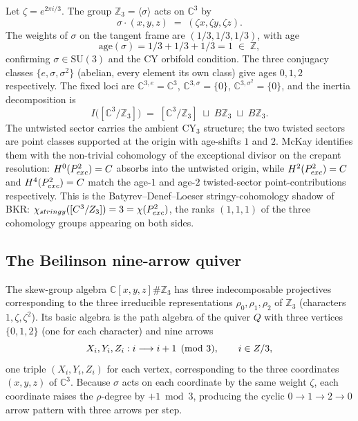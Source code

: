 Let $\zeta = e^{2\pi i/3}$. The group $\mathbb{Z}_3 = \langle \sigma \rangle$ acts on $\mathbb{C}^3$ by
\[
\sigma \cdot (x, y, z) \;=\; (\zeta x, \zeta y, \zeta z).
\]
The weights of $\sigma$ on the tangent frame are $(1/3, 1/3, 1/3)$, with age
\[
\mathrm{age}(\sigma) = 1/3 + 1/3 + 1/3 = 1 \;\in\; \mathbb{Z},
\]
confirming $\sigma \in \mathrm{SU}(3)$ and the CY orbifold condition. The three conjugacy classes $\{e, \sigma, \sigma^2\}$ (abelian, every element its own class) give ages $0, 1, 2$ respectively. The fixed loci are $\mathbb{C}^{3,e} = \mathbb{C}^3$, $\mathbb{C}^{3,\sigma} = \{0\}$, $\mathbb{C}^{3,\sigma^2} = \{0\}$, and the inertia decomposition is
\[
I\bigl([\mathbb{C}^3/\mathbb{Z}_3]\bigr) \;=\; [\mathbb{C}^3/\mathbb{Z}_3] \;\sqcup\; B\mathbb{Z}_3 \;\sqcup\; B\mathbb{Z}_3.
\]
The untwisted sector carries the ambient CY$_3$ structure; the two twisted sectors are point classes supported at the origin with age-shifts $1$ and $2$. McKay identifies them with the non-trivial cohomology of the exceptional divisor on the crepant resolution: $H^0(P^2_{exc}) = C$ absorbs into the untwisted origin, while $H^2(P^2_{exc}) = C$ and $H^4(P^2_{exc}) = C$ match the age-$1$ and age-$2$ twisted-sector point-contributions respectively. This is the Batyrev--Denef--Loeser stringy-cohomology shadow of BKR: $\chi_{stringy}([C^3/Z_3]) = 3 = \chi(P^2_{exc})$, the ranks $(1,1,1)$ of the three cohomology groups appearing on both sides.

\subsection{The Beilinson nine-arrow quiver}
\label{subsec:beilinson-quiver}

The skew-group algebra $\mathbb{C}[x,y,z] \# \mathbb{Z}_3$ has three indecomposable projectives corresponding to the three irreducible representations $\rho_0, \rho_1, \rho_2$ of $\mathbb{Z}_3$ (characters $1, \zeta, \zeta^2$). Its basic algebra is the path algebra of the quiver $Q$ with three vertices $\{0, 1, 2\}$ (one for each character) and nine arrows
\[
X_i, Y_i, Z_i : i \longrightarrow i + 1 \pmod 3, \qquad i \in Z/3,
\]
one triple $(X_i, Y_i, Z_i)$ for each vertex, corresponding to the three coordinates $(x, y, z)$ of $\mathbb{C}^3$. Because $\sigma$ acts on each coordinate by the same weight $\zeta$, each coordinate raises the $\rho$-degree by $+1 \bmod 3$, producing the cyclic $0 \to 1 \to 2 \to 0$ arrow pattern with three arrows per step.

